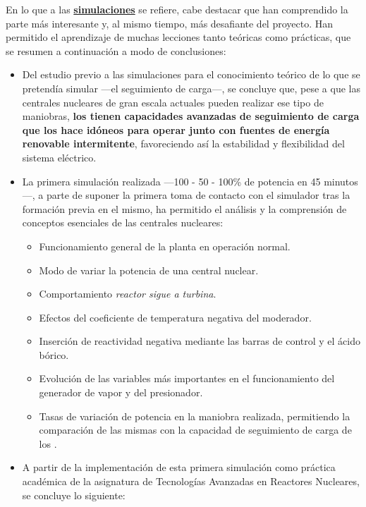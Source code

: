 En lo que a las \underline{\textbf{simulaciones}} se refiere, cabe destacar que han comprendido la parte más interesante y, al mismo tiempo, más desafiante del proyecto. Han permitido el aprendizaje de muchas lecciones tanto teóricas como prácticas, que se resumen a continuación a modo de conclusiones:

\begin{itemize}
    \item Del estudio previo a las simulaciones para el conocimiento teórico de lo que se pretendía simular ---el seguimiento de carga---, se concluye que, pese a que las centrales nucleares de gran escala actuales pueden realizar ese tipo de maniobras, \textbf{los  tienen capacidades avanzadas de seguimiento de carga que los hace idóneos para operar junto con fuentes de energía renovable intermitente}, favoreciendo así la estabilidad y flexibilidad del sistema eléctrico.
    \item La primera simulación realizada ---100 - 50 - 100\% de potencia en 45 minutos---, a parte de suponer la primera toma de contacto con el simulador tras la formación previa en el mismo, ha permitido el análisis y la comprensión de conceptos esenciales de las centrales nucleares:
    \begin{itemize}
        \item Funcionamiento general de la planta en operación normal.
        \item Modo de variar la potencia de una central nuclear.
        \item Comportamiento \textit{reactor sigue a turbina}.
        \item Efectos del coeficiente de temperatura negativa del moderador.
        \item Inserción de reactividad negativa mediante las barras de control y el ácido bórico. 
        \item Evolución de las variables más importantes en el funcionamiento del generador de vapor y del presionador.
        \item Tasas de variación de potencia en la maniobra realizada, permitiendo la comparación de las mismas con la capacidad de seguimiento de carga de los .
    \end{itemize}
    \item A partir de la implementación de esta primera simulación como práctica académica de la asignatura de Tecnologías Avanzadas en Reactores Nucleares, se concluye lo siguiente:
    \begin{itemize}

\end{itemize}
\end{itemize}
